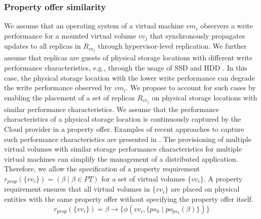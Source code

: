 \documentclass[conference]{IEEEtran}
\begin{document}
\subsubsection{Property offer similarity}
We assume that an operating system of a virtual machine $vm_i$ observers a write performance for a mounted virtual volume $vv_j$ that synchronously propagates updates to all replicas in $R_{vv_j}$ through hypervisor-level replication. We further assume that replicas are guests of physical storage locations with different write performance characteristics, e.g., through the usage of SSD and HDD \cite{Zhou2013}. In this case, the physical storage location with the lower write performance can degrade the write performance observed by $vm_i$. We propose to account for such cases by enabling the placement of a set of replicas $R_{vv_j}$ on physical storage locations with similar performance characteristics. We assume that the performance characteristics of a physical storage location is continuously captured by the Cloud provider in a property offer. Examples of recent approaches to capture such performance characteristics are presented in \cite{Noorshams2013a, Noorshams2013b, Noorshams2013c}. 
The provisioning of multiple virtual volumes with similar storage performance characteristics for multiple virtual machines can simplify the management of a distributed application. Therefore, we allow the specification of a property requirement $r_{prop}(\{vv_i\})= ( \beta \mid \beta \in PT )$ for a set of virtual volumes $\{vv_i\}$. A property requirement ensures that all virtual volumes in $\{vv_i\}$ are placed on physical entities with the same property offer without specifying the property offer itself.
\begin{equation}
r_{prop}(\{vv_i\}) = \beta \rightarrow \{ \phi(vv_i, \{ps_k \mid po_{ps_k}(\beta) \}) \}
\end{equation}
\end{document}
